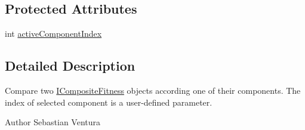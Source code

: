 \subsection*{Protected Attributes}
\begin{DoxyCompactItemize}
\item 
int \hyperlink{classnet_1_1sf_1_1jclec_1_1fitness_1_1_component_comparator_a7b4fea26c0f1dffe0b952992127bc4d7}{active\-Component\-Index}
\end{DoxyCompactItemize}


\subsection{Detailed Description}
Compare two \hyperlink{interfacenet_1_1sf_1_1jclec_1_1fitness_1_1_i_composite_fitness}{I\-Composite\-Fitness} objects according one of their components. The index of selected component is a user-\/defined parameter.

\begin{DoxyAuthor}{Author}
Sebastian Ventura 
\end{DoxyAuthor}


